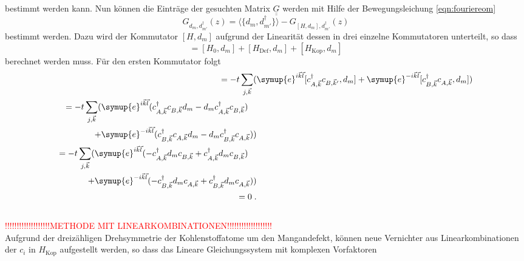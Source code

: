 bestimmt werden kann.
Nun können die Einträge der gesuchten Matrix $\underline{\underline{G}}$ werden mit Hilfe der Bewegungsleichung \eqref{eqn:fouriereom} 
\begin{equation*}
    G_{d_m, d_{m'}^\dagger}(z) = \langle \{ d_m, d_{m'}^\dagger \} \rangle - G_{[H,d_m], d_{m'}^\dagger} (z)
\end{equation*}
bestimmt werden.
Dazu wird der Kommutator $[H,d_m]$ aufgrund der Linearität dessen in drei einzelne Kommutatoren unterteilt, so dass
\begin{equation*}
    [H,d_m] = [H_0,d_m] + [H_\text{Def},d_m] +[H_\text{Kop},d_m] 
\end{equation*}
berechnet werden muss.
Für den ersten Kommutator folgt
\begin{align*}
    [H_0,d_m]   = -t \sum_{j, \vec{k}}(&\symup{e}^{i\vec{k}\vec{l}} [c^\dagger_{A,\vec{k}} c_{B,\vec{k}'}, d_m]
                +\symup{e}^{-i\vec{k}\vec{l}} [c^\dagger_{B,\vec{k}}c_{A,\vec{k}}, d_m] ) \\
                \begin{split}
                        = -t \sum_{j, \vec{k}}(&\symup{e}^{i\vec{k}\vec{l}}(c^\dagger_{A,\vec{k}} c_{B,\vec{k}} d_m
                        -d_m c^\dagger_{A,\vec{k}} c_{B,\vec{k}}) \\ 
                        +&\symup{e}^{-i\vec{k}\vec{l}}(c^\dagger_{B,\vec{k}}c_{A,\vec{k}} d_m
                        -d_m c^\dagger_{B,\vec{k}}c_{A,\vec{k}}))
                \end{split}\\
                \begin{split}
                    = -t \sum_{j, \vec{k}}    (&\symup{e}^{i\vec{k}\vec{l}}(-c^\dagger_{A,\vec{k}} d_m c_{B,\vec{k}}
                    + c^\dagger_{A,\vec{k}} d_m  c_{B,\vec{k}}) \\
                    +&\symup{e}^{-i\vec{k}\vec{l}}(-c^\dagger_{B,\vec{k}} d_m c_{A,\vec{k}}
                    + c^\dagger_{B,\vec{k}} d_m  c_{A,\vec{k}}))
                \end{split}\\ 
                = 0\; \text{.}
\end{align*} \\
\textcolor{red}{!!!!!!!!!!!!!!!!!!!METHODE MIT LINEARKOMBINATIONEN!!!!!!!!!!!!!!!!!!!} \\
Aufgrund der dreizähligen Drehsymmetrie der Kohlenstoffatome um den Mangandefekt, können neue Vernichter aus Linearkombinationen der $c_i$
in $H_\text{Kop}$ aufgestellt werden, so dass das Lineare Gleichungssystem mit komplexen Vorfaktoren 
